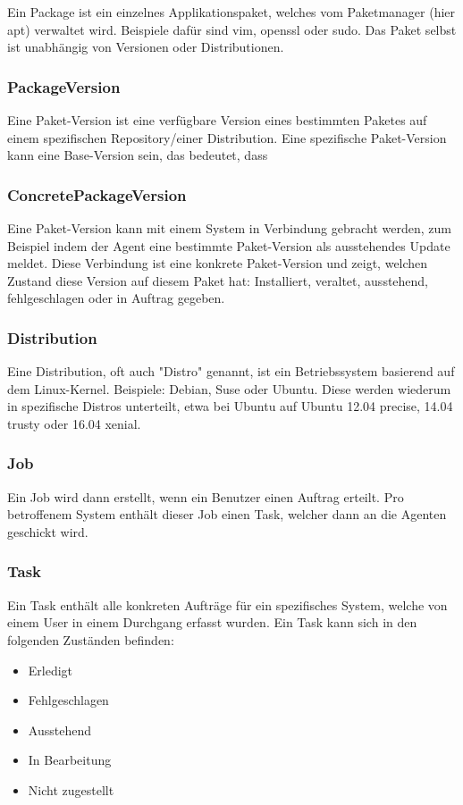 Ein Package ist ein einzelnes Applikationspaket, welches vom Paketmanager (hier apt) verwaltet wird. Beispiele dafür sind vim, openssl oder sudo. Das Paket selbst ist unabhängig von Versionen oder Distributionen.

\subsubsection{PackageVersion}

Eine Paket-Version ist eine verfügbare Version eines bestimmten Paketes auf einem spezifischen Repository/einer Distribution. Eine spezifische Paket-Version kann eine Base-Version sein, das bedeutet, dass 

\xxx[finish]

\subsubsection{ConcretePackageVersion}

Eine Paket-Version kann mit einem System in Verbindung gebracht werden, zum Beispiel indem der Agent eine bestimmte Paket-Version als ausstehendes Update meldet. Diese Verbindung ist eine konkrete Paket-Version und zeigt, welchen Zustand diese Version auf diesem Paket hat: Installiert, veraltet, ausstehend, fehlgeschlagen oder in Auftrag gegeben.

\subsubsection{Distribution}

Eine Distribution, oft auch "Distro" genannt, ist ein Betriebssystem basierend auf dem Linux-Kernel. Beispiele: Debian, Suse oder Ubuntu. Diese werden wiederum in spezifische Distros unterteilt, etwa bei Ubuntu auf Ubuntu 12.04 precise, 14.04 trusty oder 16.04 xenial. 

\subsubsection{Job}

Ein Job wird dann erstellt, wenn ein Benutzer einen Auftrag erteilt. Pro betroffenem System enthält dieser Job einen Task, welcher dann an die Agenten geschickt wird.

\subsubsection{Task}

Ein Task enthält alle konkreten Aufträge für ein spezifisches System, welche von einem User in einem Durchgang erfasst wurden. Ein Task kann sich in den folgenden Zuständen befinden:

\begin{itemize}
    \item Erledigt 
    \item Fehlgeschlagen 
    \item Ausstehend
    \item In Bearbeitung
    \item Nicht zugestellt
\end{itemize}
